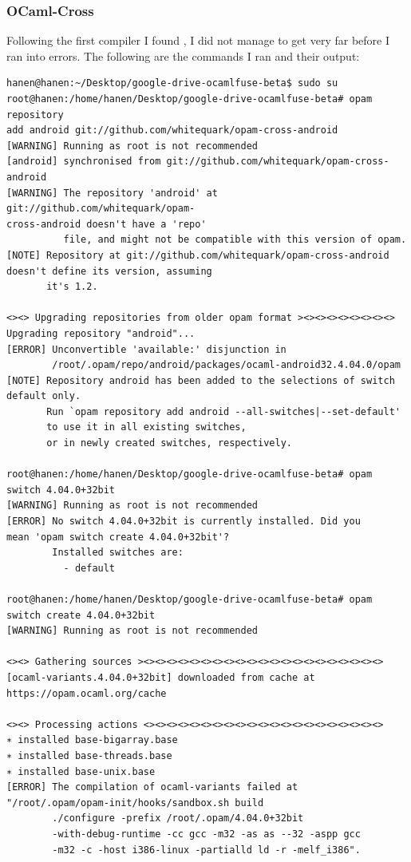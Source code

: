 \subsubsection{OCaml-Cross}
Following the first compiler I found \cite{crosscompiler}, I did not manage to get very far before I ran into errors. The following are the commands I ran and their output:
\begin{verbatim}
hanen@hanen:~/Desktop/google-drive-ocamlfuse-beta$ sudo su
root@hanen:/home/hanen/Desktop/google-drive-ocamlfuse-beta# opam repository 
add android git://github.com/whitequark/opam-cross-android
[WARNING] Running as root is not recommended
[android] synchronised from git://github.com/whitequark/opam-cross-android
[WARNING] The repository 'android' at git://github.com/whitequark/opam-
cross-android doesn't have a 'repo'
          file, and might not be compatible with this version of opam.
[NOTE] Repository at git://github.com/whitequark/opam-cross-android 
doesn't define its version, assuming
       it's 1.2.

<><> Upgrading repositories from older opam format ><><><><><><><><>
Upgrading repository "android"...
[ERROR] Unconvertible 'available:' disjunction in
        /root/.opam/repo/android/packages/ocaml-android32.4.04.0/opam
[NOTE] Repository android has been added to the selections of switch 
default only.
       Run `opam repository add android --all-switches|--set-default' 
       to use it in all existing switches,
       or in newly created switches, respectively.

root@hanen:/home/hanen/Desktop/google-drive-ocamlfuse-beta# opam 
switch 4.04.0+32bit
[WARNING] Running as root is not recommended
[ERROR] No switch 4.04.0+32bit is currently installed. Did you 
mean 'opam switch create 4.04.0+32bit'?
        Installed switches are:
          - default

root@hanen:/home/hanen/Desktop/google-drive-ocamlfuse-beta# opam 
switch create 4.04.0+32bit
[WARNING] Running as root is not recommended

<><> Gathering sources ><><><><><><><><><><><><><><><><><><><><><>
[ocaml-variants.4.04.0+32bit] downloaded from cache at 
https://opam.ocaml.org/cache

<><> Processing actions <><><><><><><><><><><><><><><><><><><><><>
∗ installed base-bigarray.base
∗ installed base-threads.base
∗ installed base-unix.base
[ERROR] The compilation of ocaml-variants failed at 
"/root/.opam/opam-init/hooks/sandbox.sh build
        ./configure -prefix /root/.opam/4.04.0+32bit 
        -with-debug-runtime -cc gcc -m32 -as as --32 -aspp gcc
        -m32 -c -host i386-linux -partialld ld -r -melf_i386".


\end{verbatim}
